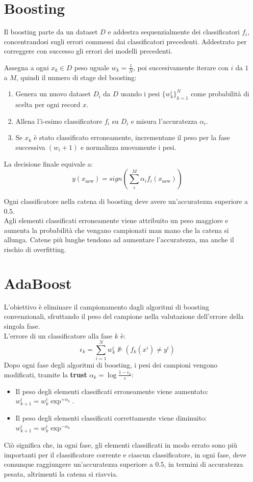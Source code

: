 \section{Boosting}
Il boosting parte da un dataset $D$ e addestra sequenzialmente dei classificatori $f_i$, concentrandosi sugli errori commessi dai classificatori precedenti.
Addestrato per correggere con successo gli errori dei modelli precedenti.

\begin{ex}[Approccio]
  Assegna a ogni $x_k \in D$ peso uguale $w_k = \frac{1}{N}$, poi succesivamente iterare con $i$ da $1$ a $M$, quindi il numero di stage del boosting:
  \begin{enumerate}
    \item Genera un nuovo dataset $D_i$ da $D$ usando i pesi $\{w^i_k\}_{k=1}^N$ come probabilità di scelta per ogni record $x$.
    \item Allena l'i-esimo classificatore $f_i$ su $D_i$ e misura l'accuratezza $\alpha_i$.
    \item Se $x_k$ è stato classificato erroneamente, incrementane il peso per la fase successiva $(w_i+1)$ e normalizza nuovamente i pesi.
  \end{enumerate}
  La decisione finale equivale a:
  \[
    y(x_{\text{new}}) = sign\left( \sum_{i}^M \alpha_i f_i(x_{\text{new}}) \right)
  \]
\end{ex}
Ogni classificatore nella catena di boosting deve avere un'accuratezza superiore a $0.5$. \\
Agli elementi classificati erroneamente viene attribuito un peso maggiore e aumenta la probabilità che vengano campionati man mano che la catena si allunga.
Catene più lunghe tendono ad aumentare l'accuratezza, ma anche il rischio di overfitting.

\section{AdaBoost}
L'obiettivo è eliminare il campionamento dagli algoritmi di boosting convenzionali, sfruttando il peso del campione nella valutazione dell'errore della singola fase. \\
L'errore di un classificatore alla fase $k$ è: 
\[
  \epsilon_k = \sum_{i=1}^N w_k^i \nVDash (f_k(x^i) \neq y^i)
\]
Dopo ogni fase degli algoritmi di boosting, i pesi dei campioni vengono modificati, tramite la \textbf{trust} $\alpha_k = \log{\frac{1 -\epsilon_k}{\epsilon}}$:
\begin{itemize}
  \item Il peso degli elementi classificati erroneamente viene aumentato: $w_{k+1}^i = w_k^i \exp^{+\alpha_k}$.
  \item Il peso degli elementi classificati correttamente viene diminuito: $w_{k+1}^i = w_k^i \exp^{-\alpha_k}$
\end{itemize}
Ciò significa che, in ogni fase, gli elementi classificati in modo errato sono più importanti per il classificatore corrente e
ciascun classificatore, in ogni fase, deve comunque raggiungere un'accuratezza superiore a $0.5$, in termini di accuratezza pesata, altrimenti la catena si riavvia.

